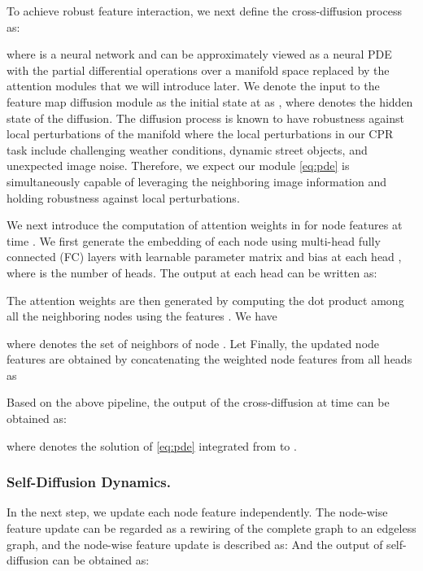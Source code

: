 \documentclass[letterpaper]{article} \usepackage{aaai23}  \usepackage{times}  \usepackage{helvet}  \usepackage{courier}  \usepackage[hyphens]{url}  \usepackage{graphicx} \urlstyle{rm} \def\UrlFont{\rm}  \usepackage{natbib}  \usepackage{caption} \frenchspacing  \setlength{\pdfpagewidth}{8.5in} \setlength{\pdfpageheight}{11in} \usepackage{booktabs}
\theoremstyle{remark}
\theoremstyle{plain}
\begin{document}
To achieve robust feature interaction, we next define the cross-diffusion process as: 

where  is a neural network and can be approximately viewed as a neural PDE  with the partial differential operations over a manifold space replaced by the attention modules that we will introduce later. We denote the input to the feature map diffusion module as the initial state at  as , where  denotes the hidden state of the diffusion.
The diffusion process is known to have robustness against local perturbations of the manifold \cite{chen1998stability} where the local perturbations in our CPR task include challenging weather conditions, dynamic street objects, and unexpected image noise. Therefore, we expect our module \cref{eq:pde} is simultaneously capable of leveraging the neighboring image information and holding robustness against local perturbations.



We next introduce the computation of attention weights in  for node features at time . 
We first generate the embedding of each node using multi-head fully connected (FC) layers with learnable parameter matrix  and bias  at each head , where  is the number of heads. The output at each head  can be written as:

The attention weights are then generated by computing the dot product among all the neighboring nodes using the features 
. We have

where  denotes the set of neighbors of node .  
Let
 Finally, the updated node features are obtained by concatenating the weighted node features from all heads as 


Based on the above pipeline, the output of the cross-diffusion at time  can be obtained as:



where  denotes the solution of \cref{eq:pde} integrated from  to . 

\subsubsection{Self-Diffusion Dynamics.} In the next step, we update each node feature independently. The node-wise feature update can be regarded as a rewiring of the complete graph to an edgeless graph, and the node-wise feature update is described as:
And the output of self-diffusion can be obtained as:
\end{document}
